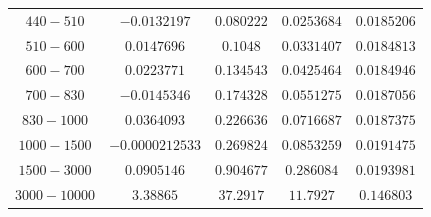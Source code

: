 \documentclass[11pt]{article}
\begin{document}
\begin{table}[htbp]
{\begin{tabular}{ccccc}
		$440-510$ & $-0.0132197$ & $0.080222$       & $0.0253684$       & $0.0185206$ \\
		$510-600$ & $0.0147696$ & $0.1048$          & $0.0331407$       & $0.0184813$ \\
		$600-700$ & $0.0223771$ & $0.134543$        & $0.0425464$       & $0.0184946$ \\
		$700-830$ & $-0.0145346$ & $0.174328$       & $0.0551275$       & $0.0187056$ \\
		$830-1000$ & $0.0364093$ & $0.226636$       & $0.0716687$       & $0.0187375$ \\
		$1000-1500$ & $-0.0000212533$ & $0.269824$  & $0.0853259$       & $0.0191475$ \\
		$1500-3000$ & $0.0905146$ & $0.904677$      & $0.286084$        & $0.0193981$ \\
		$3000-10000$ & $3.38865$ & $37.2917$        & $11.7927$         & $0.146803$ \\
	\bottomrule
	\end{tabular}
}
\end{table}
\end{document}
